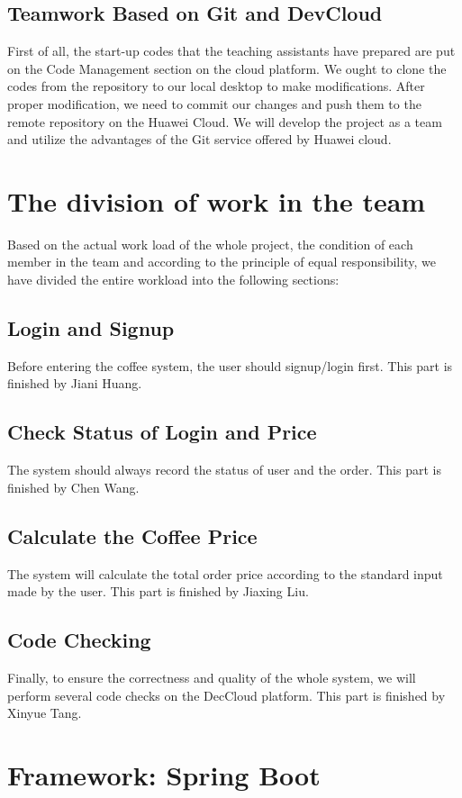 \documentclass[./report.tex]{subfiles}
\begin{document}
\subsection{Teamwork Based on Git and DevCloud}
First of all, the start-up codes that the teaching assistants have prepared are put on the Code Management section on the cloud platform. We ought to clone the codes from the repository to our local desktop to make modifications. After proper modification, we need to commit our changes and push them to the remote repository on the Huawei Cloud. 
We will develop the project as a team and utilize the advantages of the Git service offered by Huawei cloud.

\section{The division of work in the team}
Based on the actual work load of the whole project, the condition of each member in the team and according to the principle of equal responsibility, we have divided the entire workload into the following sections:
 \subsection{Login and Signup}
 Before entering the coffee system, the user should signup/login first. This part is finished by Jiani Huang. 
 \subsection{Check Status of Login and Price}
 The system should always record the status of user and the order. This part is finished by Chen Wang.
 \subsection{Calculate the Coffee Price}
 The system will calculate the total order price according to the standard input made by the user. This part is finished by Jiaxing Liu.
  \subsection{Code Checking}
  Finally, to ensure the correctness and quality of the whole system, we will perform several code checks on the DecCloud platform. This part is finished by Xinyue Tang.
\section{Framework: Spring Boot}
\end{document}
